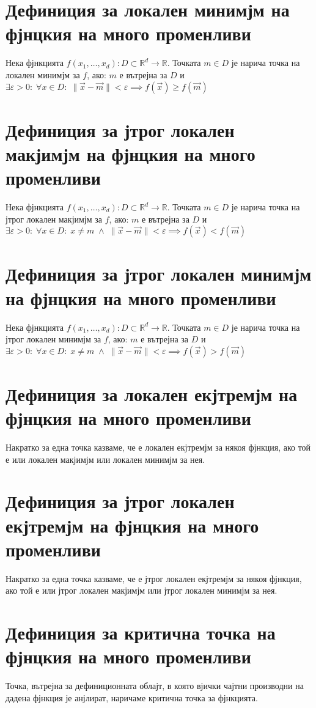 \documentclass[14pt]{extarticle}
\newcommand{\R}{\mathbb{R}}
\newcommand{\Vector}[1]{\overrightarrow{#1}}
\begin{document}
\section*{Дефиниция за локален минимјм на фјнцкия на много променливи}
Нека фјнкцията \(f(x_1, \dots, x_d) : D \subset \R^d \to \R\). Точката \(m \in D\) је нарича точка на локален минимјм за \(f\), ако: \(m\) е вътрејна за \(D\) и \\
\(\exists \varepsilon > 0 : \; \forall x \in D : \; \|\Vector{x} - \Vector{m}\| < \varepsilon \implies f(\Vector{x}) \geq f(\Vector{m})\)
\section*{Дефиниция за јтрог локален макјимјм на фјнцкия на много променливи}
Нека фјнкцията \(f(x_1, \dots, x_d) : D \subset \R^d \to \R\). Точката \(m \in D\) је нарича точка на јтрог локален макјимјм за \(f\), ако: \(m\) е вътрејна за \(D\) и \\
\(\exists \varepsilon > 0 : \; \forall x \in D : \; x \neq m \; \land \; \|\Vector{x} - \Vector{m}\| < \varepsilon \implies f(\Vector{x}) < f(\Vector{m})\)
\section*{Дефиниция за јтрог локален минимјм на фјнцкия на много променливи}
Нека фјнкцията \(f(x_1, \dots, x_d) : D \subset \R^d \to \R\). Точката \(m \in D\) је нарича точка на јтрог локален минимјм за \(f\), ако: \(m\) е вътрејна за \(D\) и \\
\(\exists \varepsilon > 0 : \; \forall x \in D : \; x \neq m \; \land \; \|\Vector{x} - \Vector{m}\| < \varepsilon \implies f(\Vector{x}) > f(\Vector{m})\)
\section*{Дефиниция за локален екјтремјм на фјнцкия на много променливи}
Накратко за една точка казваме, че е локален екјтремјм за някоя фјнкция, ако той е или локален макјимјм или локален минимјм за нея.
\section*{Дефиниция за јтрог локален екјтремјм на фјнцкия на много променливи}
Накратко за една точка казваме, че е јтрог локален екјтремјм за някоя фјнкция, ако той е или јтрог локален макјимјм или јтрог локален минимјм за нея.
\section*{Дефиниция за критична точка на фјнцкия на много променливи}
Точка, вътрејна за дефиниционната облајт, в която вјички чајтни производни на дадена фјнкция је анјлират, наричаме критична точка за фјнкцията.
\end{document}
